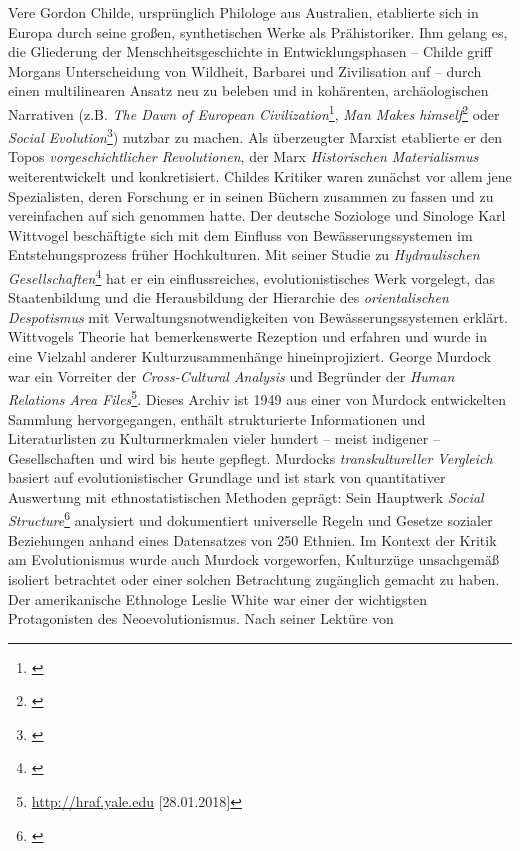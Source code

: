 \documentclass[openany,twoside,twocolumn]{book}
\let\rmarkdownfootnote\footnote%
\def\footnote{\protect\rmarkdownfootnote}
\begin{document}
Vere Gordon Childe, ursprünglich Philologe aus Australien, etablierte
sich in Europa durch seine großen, synthetischen Werke als
Prähistoriker. Ihm gelang es, die Gliederung der Menschheitsgeschichte
in Entwicklungsphasen -- Childe griff Morgans Unterscheidung von
Wildheit, Barbarei und Zivilisation auf -- durch einen multilinearen
Ansatz neu zu beleben und in kohärenten, archäologischen Narrativen
(z.B. \emph{The Dawn of European Civilization}\footnote{\textcite{childe_dawn_1925}},
\emph{Man Makes himself}\footnote{\textcite{childe_man_1936}} oder
\emph{Social Evolution}\footnote{\textcite{childe_social_1951}}) nutzbar
zu machen. Als überzeugter Marxist etablierte er den Topos
\emph{vorgeschichtlicher Revolutionen}, der Marx \emph{Historischen
Materialismus} weiterentwickelt und konkretisiert. Childes Kritiker
waren zunächst vor allem jene Spezialisten, deren Forschung er in seinen
Büchern zusammen zu fassen und zu vereinfachen auf sich genommen hatte.
Der deutsche Soziologe und Sinologe Karl Wittvogel beschäftigte sich mit
dem Einfluss von Bewässerungssystemen im Entstehungsprozess früher
Hochkulturen. Mit seiner Studie zu \emph{Hydraulischen
Gesellschaften}\footnote{\textcite{wittfogel_oriental_1957}} hat er ein
einflussreiches, evolutionistisches Werk vorgelegt, das Staatenbildung
und die Herausbildung der Hierarchie des \emph{orientalischen
Despotismus} mit Verwaltungsnotwendigkeiten von Bewässerungssystemen
erklärt. Wittvogels Theorie hat bemerkenswerte Rezeption und erfahren
und wurde in eine Vielzahl anderer Kulturzusammenhänge hineinprojiziert.
George Murdock war ein Vorreiter der \emph{Cross-Cultural Analysis} und
Begründer der \emph{Human Relations Area Files}\footnote{\url{http://hraf.yale.edu}
  {[}28.01.2018{]}}. Dieses Archiv ist 1949 aus einer von Murdock
entwickelten Sammlung hervorgegangen, enthält strukturierte
Informationen und Literaturlisten zu Kulturmerkmalen vieler hundert --
meist indigener -- Gesellschaften und wird bis heute gepflegt. Murdocks
\emph{transkultureller Vergleich} basiert auf evolutionistischer
Grundlage und ist stark von quantitativer Auswertung mit
ethnostatistischen Methoden geprägt: Sein Hauptwerk \emph{Social
Structure}\footnote{\textcite{murdock_social_1949}} analysiert und
dokumentiert universelle Regeln und Gesetze sozialer Beziehungen anhand
eines Datensatzes von 250 Ethnien. Im Kontext der Kritik am
Evolutionismus wurde auch Murdock vorgeworfen, Kulturzüge unsachgemäß
isoliert betrachtet oder einer solchen Betrachtung zugänglich gemacht zu
haben. Der amerikanische Ethnologe Leslie White war einer der
wichtigsten Protagonisten des Neoevolutionismus. Nach seiner Lektüre von
\end{document}
